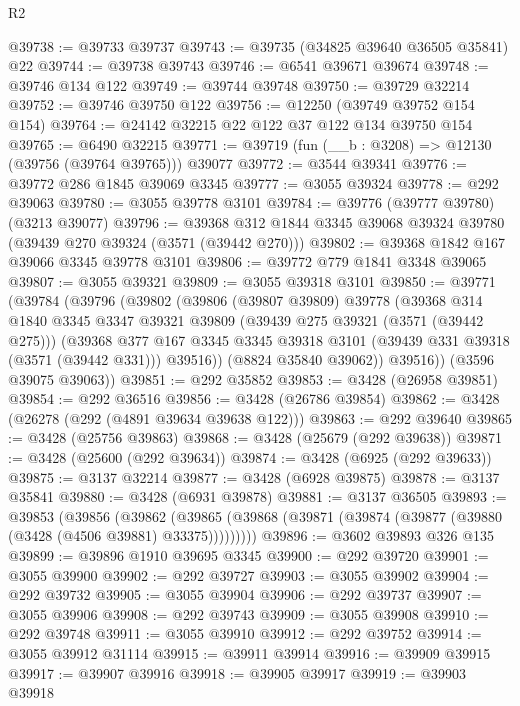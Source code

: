 \begin{lexlean}{R2}
\begin{coremodule}
@39738 := @39733 @39737
@39743 := @39735 (@34825 @39640 @36505 @35841) @22
@39744 := @39738 @39743
@39746 := @6541 @39671 @39674
@39748 := @39746 @134 @122
@39749 := @39744 @39748
@39750 := @39729 @32214
@39752 := @39746 @39750 @122
@39756 := @12250 (@39749 @39752 @154 @154)
@39764 := @24142 @32215 @22 @122 @37 @122 @134 @39750 @154
@39765 := @6490 @32215
@39771 := @39719 (fun (__b : @3208) => @12130 (@39756 (@39764 @39765))) @39077
@39772 := @3544 @39341
@39776 := @39772 @286 @1845 @39069 @3345
@39777 := @3055 @39324
@39778 := @292 @39063
@39780 := @3055 @39778 @3101
@39784 := @39776 (@39777 @39780) (@3213 @39077)
@39796 := @39368 @312 @1844 @3345 @39068 @39324 @39780 (@39439 @270 @39324 (@3571 (@39442 @270)))
@39802 := @39368 @1842 @167 @39066 @3345 @39778 @3101
@39806 := @39772 @779 @1841 @3348 @39065
@39807 := @3055 @39321
@39809 := @3055 @39318 @3101
@39850 := @39771
    (@39784
      (@39796
        (@39802
          (@39806
            (@39807 @39809)
            @39778
            (@39368
              @314
              @1840
              @3345
              @3347
              @39321
              @39809
              (@39439 @275 @39321 (@3571 (@39442 @275)))
              (@39368
                @377
                @167
                @3345
                @3345
                @39318
                @3101
                (@39439 @331 @39318 (@3571 (@39442 @331)))
                @39516))
            (@8824 @35840 @39062))
          @39516))
      (@3596 @39075 @39063))
@39851 := @292 @35852
@39853 := @3428 (@26958 @39851)
@39854 := @292 @36516
@39856 := @3428 (@26786 @39854)
@39862 := @3428 (@26278 (@292 (@4891 @39634 @39638 @122)))
@39863 := @292 @39640
@39865 := @3428 (@25756 @39863)
@39868 := @3428 (@25679 (@292 @39638))
@39871 := @3428 (@25600 (@292 @39634))
@39874 := @3428 (@6925 (@292 @39633))
@39875 := @3137 @32214
@39877 := @3428 (@6928 @39875)
@39878 := @3137 @35841
@39880 := @3428 (@6931 @39878)
@39881 := @3137 @36505
@39893 := @39853
    (@39856
      (@39862 (@39865 (@39868 (@39871 (@39874 (@39877 (@39880 (@3428 (@4506 @39881) @33375)))))))))
@39896 := @3602 @39893 @326 @135
@39899 := @39896 @1910 @39695 @3345
@39900 := @292 @39720
@39901 := @3055 @39900
@39902 := @292 @39727
@39903 := @3055 @39902
@39904 := @292 @39732
@39905 := @3055 @39904
@39906 := @292 @39737
@39907 := @3055 @39906
@39908 := @292 @39743
@39909 := @3055 @39908
@39910 := @292 @39748
@39911 := @3055 @39910
@39912 := @292 @39752
@39914 := @3055 @39912 @31114
@39915 := @39911 @39914
@39916 := @39909 @39915
@39917 := @39907 @39916
@39918 := @39905 @39917
@39919 := @39903 @39918

\end{coremodule}
\end{lexlean}
